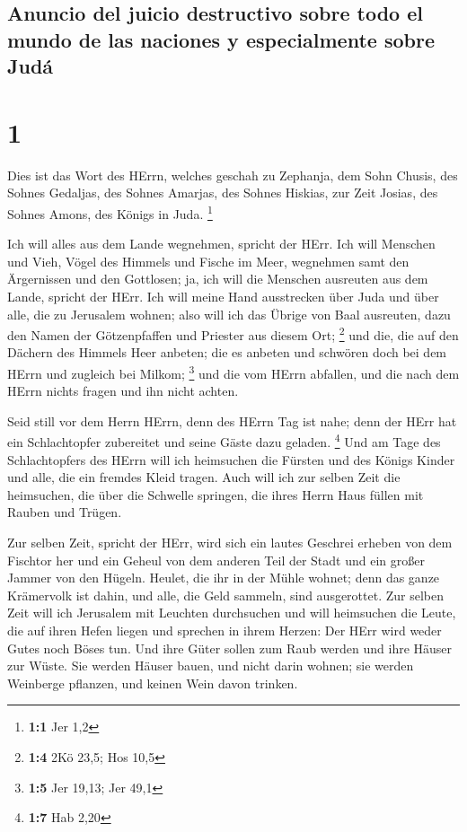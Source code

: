 \hypertarget{anuncio-del-juicio-destructivo-sobre-todo-el-mundo-de-las-naciones-y-especialmente-sobre-juduxe1}{%
\subsection{Anuncio del juicio destructivo sobre todo el mundo de las
naciones y especialmente sobre
Judá}\label{anuncio-del-juicio-destructivo-sobre-todo-el-mundo-de-las-naciones-y-especialmente-sobre-juduxe1}}

\hypertarget{section}{%
\section{1}\label{section}}

 Dies ist das Wort des HErrn, welches geschah zu Zephanja,
dem Sohn Chusis, des Sohnes Gedaljas, des Sohnes Amarjas, des Sohnes
Hiskias, zur Zeit Josias, des Sohnes Amons, des Königs in Juda.
\footnote{\textbf{1:1} Jer 1,2}

 Ich will alles aus dem Lande wegnehmen, spricht der HErr.
 Ich will Menschen und Vieh, Vögel des Himmels und Fische
im Meer, wegnehmen samt den Ärgernissen und den Gottlosen; ja, ich will
die Menschen ausreuten aus dem Lande, spricht der HErr. 
Ich will meine Hand ausstrecken über Juda und über alle, die zu
Jerusalem wohnen; also will ich das Übrige von Baal ausreuten, dazu den
Namen der Götzenpfaffen und Priester aus diesem Ort; \footnote{\textbf{1:4}
  2Kö 23,5; Hos 10,5}  und die, die auf den Dächern des
Himmels Heer anbeten; die es anbeten und schwören doch bei dem HErrn und
zugleich bei Milkom; \footnote{\textbf{1:5} Jer 19,13; Jer 49,1}
 und die vom HErrn abfallen, und die nach dem HErrn nichts
fragen und ihn nicht achten.

 Seid still vor dem Herrn HErrn, denn des HErrn Tag ist
nahe; denn der HErr hat ein Schlachtopfer zubereitet und seine Gäste
dazu geladen. \footnote{\textbf{1:7} Hab 2,20}  Und am
Tage des Schlachtopfers des HErrn will ich heimsuchen die Fürsten und
des Königs Kinder und alle, die ein fremdes Kleid tragen. 
Auch will ich zur selben Zeit die heimsuchen, die über die Schwelle
springen, die ihres Herrn Haus füllen mit Rauben und Trügen.

 Zur selben Zeit, spricht der HErr, wird sich ein lautes
Geschrei erheben von dem Fischtor her und ein Geheul von dem anderen
Teil der Stadt und ein großer Jammer von den Hügeln. 
Heulet, die ihr in der Mühle wohnet; denn das ganze Krämervolk ist
dahin, und alle, die Geld sammeln, sind ausgerottet.  Zur
selben Zeit will ich Jerusalem mit Leuchten durchsuchen und will
heimsuchen die Leute, die auf ihren Hefen liegen und sprechen in ihrem
Herzen: Der HErr wird weder Gutes noch Böses tun.  Und
ihre Güter sollen zum Raub werden und ihre Häuser zur Wüste. Sie werden
Häuser bauen, und nicht darin wohnen; sie werden Weinberge pflanzen, und
keinen Wein davon trinken.

